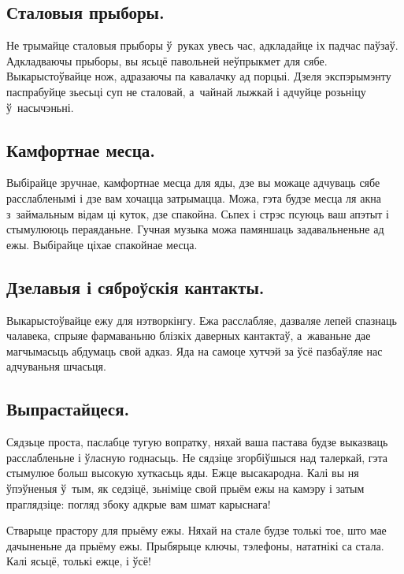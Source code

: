 \subsection{Сталовыя прыборы.}
Не трымайце сталовыя прыборы ў~руках увесь час, адкладайце іх падчас паўзаў. Адкладваючы прыборы, вы ясьцё павольней неўпрыкмет для сябе. Выкарыстоўвайце нож, адразаючы па кавалачку ад порцыі. Дзеля экспэрымэнту паспрабуйце зьесьці суп не сталовай, а~чайнай лыжкай і адчуйце розьніцу ў~насычэньні.

\subsection{Камфортнае месца.}
Выбірайце зручнае, камфортнае месца для яды, дзе вы можаце адчуваць сябе расслабленымі і дзе вам хочацца затрымацца. Можа, гэта будзе месца ля акна з~займальным відам ці куток, дзе спакойна. Сьпех і стрэс псуюць ваш апэтыт і стымулююць пераяданьне. Гучная музыка можа памяншаць задавальненьне ад ежы. Выбірайце ціхае спакойнае месца.

\subsection{Дзелавыя і сяброўскія кантакты.}
Выкарыстоўвайце ежу для нэтворкінгу. Ежа расслабляе, дазваляе лепей спазнаць чалавека, спрыяе фармаваньню блізкіх даверных кантактаў, а~жаваньне дае магчымасьць абдумаць свой адказ. Яда на самоце хутчэй за ўсё пазбаўляе нас адчуваньня шчасьця.

\subsection{Выпрастайцеся.}
Сядзьце проста, паслабце тугую вопратку, няхай ваша пастава будзе выказваць расслабленьне і ўласную годнасьць. Не сядзіце згорбіўшыся над талеркай, гэта стымулюе больш высокую хуткасьць яды. Ежце высакародна. Калі вы ня ўпэўненыя ў~тым, як седзіцё, зьніміце свой прыём ежы на камэру і затым праглядзіце: погляд збоку адкрые вам шмат карыснага!

Стварыце прастору для прыёму ежы. Няхай на стале будзе толькі тое, што мае дачыненьне да прыёму ежы. Прыбярыце ключы, тэлефоны, нататнікі са стала. Калі ясьцё, толькі ежце, і ўсё!


